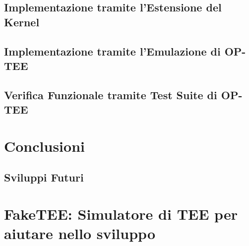 \documentclass[12pt,italian]{report}
\begin{document}
\section{Implementazione tramite l'Estensione del Kernel}
\label{sec:implementazione-passthrough-tramite-kernel-module}

\section{Implementazione tramite l'Emulazione di OP-TEE}
\label{sec:implementazione-passthrough-tramite-bootloader}

\section{Verifica Funzionale tramite Test Suite di OP-TEE}
\label{sec:verifica-funzionale-via-optee}

\chapter{Conclusioni}
\label{chap:conclusioni}


\section{Sviluppi Futuri}
\label{sec:sviluppi-futuri}

\appendix
\chapter{FakeTEE: Simulatore di TEE per aiutare nello sviluppo}



\end{document}
